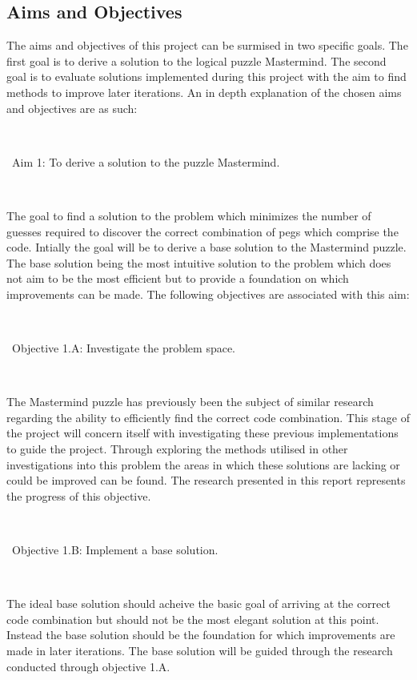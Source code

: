 \documentclass[12pt]{article}  %
\theoremstyle{definition}
\theoremstyle{remark}
\begin{document}
\subsection {Aims and Objectives}
The aims and objectives of this project can be surmised in two specific goals. The first goal is to derive a solution to the logical puzzle 
Mastermind. The second goal is to evaluate solutions implemented during this project with the aim to find methods to improve later 
iterations. An in depth explanation of the chosen aims and objectives are as such:

\

\textbullet\ Aim 1: To derive a solution to the puzzle Mastermind.

\

 The goal to find a solution to the problem which minimizes the number of guesses required to discover the correct combination of 
pegs which comprise the code. Intially the goal will be to derive a base solution to the Mastermind puzzle. The base solution being the 
most intuitive solution to the problem which does not aim to be the most efficient but to provide a foundation on which improvements 
can be made. The following objectives are associated with this aim:

\

\textbullet\ Objective 1.A: Investigate the problem space.

\

The Mastermind puzzle has previously been the subject of similar research regarding the ability to efficiently find the correct code 
combination. This stage of the project will concern itself with investigating these previous implementations to guide the project. 
Through exploring the methods utilised in other investigations into this problem the areas in which these solutions are lacking or could
be improved can be found. The research presented in this report represents the progress of this objective.

\

\textbullet\ Objective 1.B:  Implement a base solution.

\

The ideal base solution should acheive the basic goal of arriving at the correct code combination but should not be the most elegant 
solution at this point. Instead the base solution should be the foundation for which improvements are made in later iterations. 
The base solution will be guided through the research conducted through objective 1.A.
\end{document}
